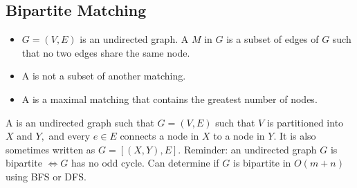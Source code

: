 \documentclass[a4paper,12pt]{article}
\begin{document}
\subsection{Bipartite Matching}
\begin{itemize}
    \item $G=(V,E)$ is an undirected graph. A  $M$ in $G$ is a subset of edges of $G$ such that no two edges share the same node.
    \item A  is not a subset of another matching.
    \item A  is a maximal matching that contains the greatest number of nodes.
\end{itemize}
A  is an undirected graph such that $G=(V,E)$ such that $V$ is partitioned into $X$ and $Y,$ and every $e\in E$ connects a node in $X$ to a node in $Y.$ It is also sometimes written as $G=[(X,Y),E].$ Reminder: an undirected graph $G$ is bipartite $\iff G$ has no odd cycle. Can determine if $G$ is bipartite in $O(m+n)$ using BFS or DFS.
\end{document}

